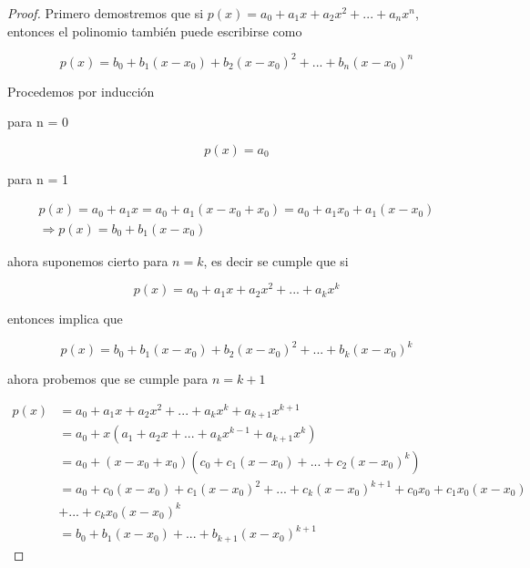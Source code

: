 \documentclass[12pt,oneside]{book}
\begin{document}
\begin{proof}
    Primero demostremos que si $p(x) = a_0 + a_1 x + a_2 x^2 + ... + a_n x^n$, entonces el polinomio también puede escribirse como

    \begin{equation*}
        p(x) = b_0 + b_1(x-x_0)+b_2(x-x_0)^2+...+b_n(x-x_0)^n
    \end{equation*}

    Procedemos por inducción

    para n = 0

    \begin{equation*}
        p(x) = a_0
    \end{equation*}

    para n = 1

    \begin{gather*}
        p(x) = a_0  + a_1 x = a_0 + a_1(x -x_0 + x_0)  = a_0 +a_1 x_0 +a_1(x-x_0) \\
        \Rightarrow p(x) = b_0+b_1(x-x_0)
    \end{gather*}

    ahora suponemos cierto para $n = k$, es decir se cumple que si

    \begin{equation*}
        p(x)  =a_0 + a_1x + a_2x^2 + ... + a_k x^k
    \end{equation*}

    entonces implica que

    \begin{equation*}
        p(x) = b_0 + b_1(x-x_0) + b_2 (x-x_0)^2 + ... + b_k (x-x_0)^k
    \end{equation*}

    ahora probemos que se cumple para $n = k+ 1$

    \begin{align*}
            p(x) &= a_0 + a_1x + a_2x^2 + ... + a_k x^k + a_{k+1}x^{k+1} \\
            &= a_0 + x(a_1 + a_2x + ... + a_k x^{k-1} + a_{k+1}x^k) \\
            &= a_0 + (x-x_0+x_0)(c_0+c_1(x-x_0) + ... +c_2(x-x_0)^k) \\
            &= a_0 + c_0(x-x_0)+c_1(x-x_0)^2+...+c_k(x-x_0)^{k+1}+ c_0x_0 + c_1x_0(x-x_0) \\
            &+ ... + c_k x_0(x-x_0)^k \\
            &= b_0 + b_1(x-x_0)+...+b_{k+1}(x-x_0)^{k+1}
    \end{align*}


\end{proof}
\end{document}
